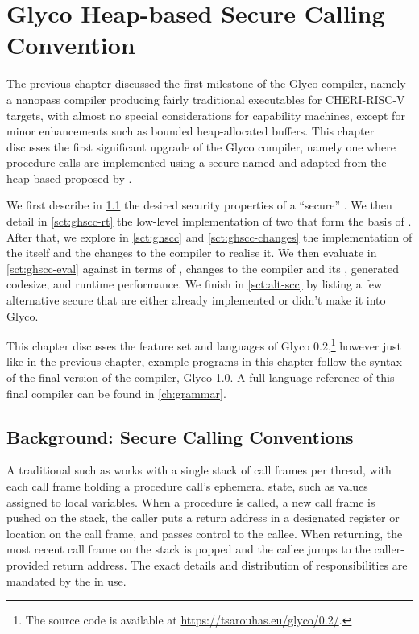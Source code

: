 \documentclass[main.tex]{subfiles}
\begin{document}
\onlyinsubfile{\mainmatter{}}

\chapter{Glyco Heap-based Secure Calling Convention}
The previous chapter discussed the first milestone of the Glyco compiler, namely a nanopass compiler producing fairly traditional executables for CHERI-RISC-V targets, with almost no special considerations for capability machines, except for minor enhancements such as bounded heap-allocated buffers. This chapter discusses the first significant upgrade of the Glyco compiler, namely one where procedure calls are implemented using a secure  named \textbf{} and adapted from the heap-based  proposed by \cite{cerise}.

We first describe in \cref{sct:scc} the desired security properties of a \enquote{secure} . We then detail in \cref{sct:ghscc-rt} the low-level implementation of two  that form the basis of . After that, we explore in \cref{sct:ghscc} and \cref{sct:ghscc-changes} the implementation of the  itself and the changes to the compiler to realise it. We then evaluate in \cref{sct:ghscc-eval}  against  in terms of , changes to the compiler and its , generated codesize, and runtime performance. We finish in \cref{sct:alt-scc} by listing a few alternative secure  that are either already implemented or didn't make it into Glyco.

This chapter discusses the feature set and languages of Glyco 0.2,\footnote{The source code is available at \url{https://tsarouhas.eu/glyco/0.2/}.} however just like in the previous chapter, example programs in this chapter follow the syntax of the final version of the compiler, Glyco 1.0. A full language reference of this final compiler can be found in \cref{ch:grammar}.

\section{Background: Secure Calling Conventions} \label{sct:scc}
A traditional  such as  works with a single stack of call frames per thread, with each call frame holding a procedure call's ephemeral state, such as values assigned to local variables. When a procedure is called, a new call frame is pushed on the stack, the caller puts a return address in a designated register or location on the call frame, and passes control to the callee. When returning, the most recent call frame on the stack is popped and the callee jumps to the caller-provided return address. The exact details and distribution of responsibilities are mandated by the  in use.
\end{document}
